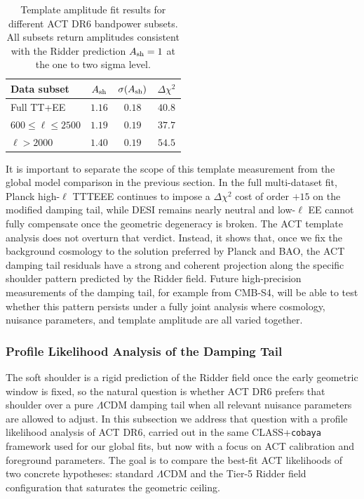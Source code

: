 \documentclass[a4paper,11pt]{article}
\begin{document}
\begin{table}[h]
\centering
\caption{Template amplitude fit results for different ACT DR6 bandpower subsets. All subsets return amplitudes consistent with the Ridder prediction $A_{\rm sh}=1$ at the one to two sigma level.}
\label{tab:template_robustness}
\begin{tabular}{lccc}
\toprule
\textbf{Data subset} & $A_{\rm sh}$ & $\sigma(A_{\rm sh})$ & $\Delta\chi^2$ \\
\midrule
Full TT+EE & $1.16$ & $0.18$ & $40.8$ \\
$600 \le \ell \le 2500$ & $1.19$ & $0.19$ & $37.7$ \\
$\ell > 2000$ & $1.40$ & $0.19$ & $54.5$ \\
\bottomrule
\end{tabular}
\end{table}

It is important to separate the scope of this template measurement from the global model comparison in the previous section. In the full multi-dataset fit, Planck high-$\ell$ TTTEEE continues to impose a $\Delta\chi^2$ cost of order $+15$ on the modified damping tail, while DESI remains nearly neutral and low-$\ell$ EE cannot fully compensate once the geometric degeneracy is broken. The ACT template analysis does not overturn that verdict. Instead, it shows that, once we fix the background cosmology to the solution preferred by Planck and BAO, the ACT damping tail residuals have a strong and coherent projection along the specific shoulder pattern predicted by the Ridder field. Future high-precision measurements of the damping tail, for example from CMB-S4, will be able to test whether this pattern persists under a fully joint analysis where cosmology, nuisance parameters, and template amplitude are all varied together.

\subsubsection{Profile Likelihood Analysis of the Damping Tail}
\label{sec:profile_likelihood}

The soft shoulder is a rigid prediction of the Ridder field once the early geometric window is fixed, so the natural question is whether ACT DR6 prefers that shoulder over a pure $\Lambda$CDM damping tail when all relevant nuisance parameters are allowed to adjust. In this subsection we address that question with a profile likelihood analysis of ACT DR6, carried out in the same CLASS+\texttt{cobaya} framework used for our global fits, but now with a focus on ACT calibration and foreground parameters. The goal is to compare the best-fit ACT likelihoods of two concrete hypotheses: standard $\Lambda$CDM and the Tier-5 Ridder field configuration that saturates the geometric ceiling.
\end{document}
